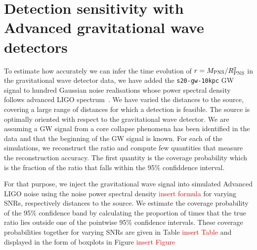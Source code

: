 \section{Detection sensitivity with Advanced gravitational wave detectors}
\label{sec:results}

To estimate how accurately we can infer the time evolution of $r=M_{\rm PNS}/R_{\rm PNS}^2$ in the
gravitational wave detector data, we have added the {\tt s20-gw-10kpc} GW signal to hundred
Gaussian noise realisations whose power spectral density follows advanced LIGO
spectrum~\cite{aLIGOspectrum}. We have varied the distances to the source, covering a large
range of distances for which a detection is feasible. The source is optimally oriented with
respect to the gravitational wave detector. We are assuming a GW signal from a core collapse
phenomena has been identified in the data and that the beginning of the GW signal is known.
For each of the simulations, we reconstruct the ratio and compute few quantities that measure
the reconstruction accuracy. The first quantity is the coverage probability which is the
fraction of the ratio that falls within the 95\% confiddence interval.  


For that purpose, we inject the gravitational wave signal into  simulated Advanced LIGO noise
using the noise power spectral density \textcolor{red}{insert formula} for varying
SNRs, respectively distances to the source. We estimate the coverage probability of the 95\%
confidence band by calculating the proportion of times that the true ratio lies outside one
of the pointwise 95\% confidence intervals.
These coverage probabilities together for varying SNRs are given in Table
\textcolor{red}{insert Table} and displayed in the form of boxplots in Figure
\textcolor{red}{insert Figure}
